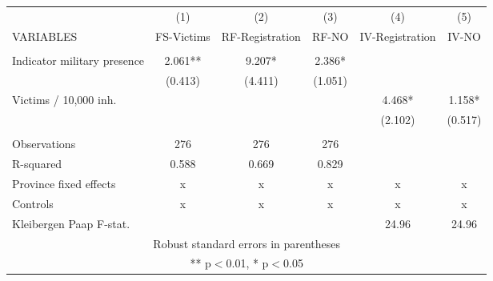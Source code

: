 \begin{tabular}{lccccc} \hline
 & (1) & (2) & (3) & (4) & (5) \\
VARIABLES & FS-Victims & RF-Registration & RF-NO & IV-Registration & IV-NO \\ \hline
 &  &  &  &  &  \\
Indicator military presence & 2.061** & 9.207* & 2.386* &  &  \\
 & (0.413) & (4.411) & (1.051) &  &  \\
Victims / 10,000 inh. &  &  &  & 4.468* & 1.158* \\
 &  &  &  & (2.102) & (0.517) \\
 &  &  &  &  &  \\
Observations & 276 & 276 & 276 &  &  \\
R-squared & 0.588 & 0.669 & 0.829 &  &  \\
Province fixed effects & x & x & x & x & x \\
Controls & x & x & x & x & x \\
 Kleibergen Paap F-stat. &  &  &  & 24.96 & 24.96 \\ \hline
\multicolumn{6}{c}{ Robust standard errors in parentheses} \\
\multicolumn{6}{c}{ ** p$<$0.01, * p$<$0.05} \\
\end{tabular}
